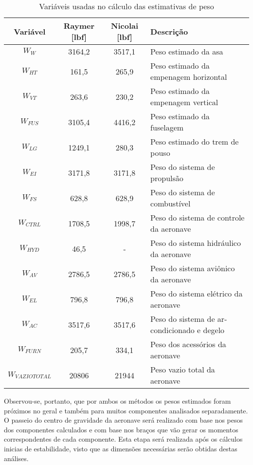 \begin{table}[h]
	\label{tbl:estimativasPeso_resultados}
	\caption{Variáveis usadas no cálculo das estimativas de peso}
	\centering
	\begin{tabular}{cccl}
		\toprule
			Variável & Raymer [\si{lbf}] & Nicolai [\si{lbf}] & Descrição \\
		\midrule
			$ W_{W} $
				& 3164,2
				& 3517,1
				& Peso estimado da asa
			\\
			$ W_{HT} $
				& 161,5
				& 265,9
				& Peso estimado da empenagem horizontal
			\\
			$ W_{VT} $
				& 263,6
				& 230,2
				& Peso estimado da empenagem vertical
			\\
			$ W_{FUS} $
				& 3105,4
				& 4416,2
				& Peso estimado da fuselagem
			\\
			$ W_{LG} $
				& 1249,1
				& 280,3
				& Peso estimado do trem de pouso
			\\
			$ W_{EI} $
				& 3171,8
				& 3171,8
				& Peso do sistema de propulsão
			\\
			$ W_{FS} $
				& 628,8
				& 628,9
				& Peso do sistema de combustível
			\\
			$ W_{CTRL} $
				& 1708,5
				& 1998,7
				& Peso do sistema de controle da aeronave
			\\
			$ W_{HYD} $
				& 46,5
				& -
				& Peso do sistema hidráulico da aeronave
			\\
			$ W_{AV} $
				& 2786,5
				& 2786,5
				& Peso do sistema aviônico da aeronave
			\\
			$ W_{EL} $
				& 796,8
				& 796,8
				& Peso do sistema elétrico da aeronave
			\\
			$ W_{AC} $
				& 3517,6
				& 3517,6
				& Peso do sistema de ar-condicionado e degelo
			\\
			$ W_{FURN} $
				& 205,7
				& 334,1
				& Peso dos acessórios da aeronave
			\\
			\bottomrule
			$ W_{VAZIO TOTAL} $
				& 20806
				& 21944
				& Peso vazio total da aeronave
			\\ \hline
	\end{tabular}
\end{table}

Observou-se, portanto, que por ambos os métodos os pesos estimados foram próximos no geral e também para muitos componentes analisados separadamente.
O passeio do centro de gravidade da aeronave será realizado com base nos pesos dos componentes calculados e com base nos braços que vão gerar os momentos correspondentes de cada componente. Esta etapa será realizada após os cálculos inicias de estabilidade, visto que as dimensões necessárias serão obtidas destas análises. 
